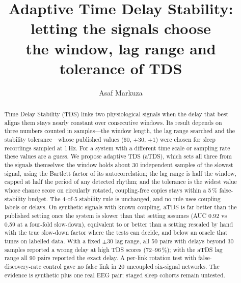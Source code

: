 \documentclass[11pt,a4paper]{article}
\title{Adaptive Time Delay Stability: letting the signals choose\\the window, lag range and tolerance of TDS}
\author{Asaf Markuza}
\date{}
\begin{document}
\maketitle

\begin{abstract}
Time Delay Stability (TDS) links two physiological signals when the delay that best aligns them stays nearly constant over consecutive windows. Its result depends on three numbers counted in samples---the window length, the lag range searched and the stability tolerance---whose published values (60, $\pm30$, $\pm1$) were chosen for sleep recordings sampled at 1\,Hz. For a system with a different time scale or sampling rate these values are a guess. We propose adaptive TDS (aTDS), which sets all three from the signals themselves: the window holds about 30 independent samples of the slowest signal, using the Bartlett factor of its autocorrelation; the lag range is half the window, capped at half the period of any detected rhythm; and the tolerance is the widest value whose chance score on circularly rotated, coupling-free copies stays within a 5\,\% false-stability budget. The 4-of-5 stability rule is unchanged, and no rule uses coupling labels or delays. On synthetic signals with known coupling, aTDS is far better than the published setting once the system is slower than that setting assumes (AUC 0.92 vs 0.59 at a four-fold slow-down), equivalent to or better than a setting rescaled by hand with the true slow-down factor where the tests can decide, and below an oracle that tunes on labelled data. With a fixed $\pm30$ lag range, all 50 pairs with delays beyond 30 samples reported a wrong delay at high TDS scores (72--96\,\%); with the aTDS lag range all 90 pairs reported the exact delay. A per-link rotation test with false-discovery-rate control gave no false link in 20 uncoupled six-signal networks. The evidence is synthetic plus one real EEG pair; staged sleep cohorts remain untested.
\end{abstract}
\end{document}
